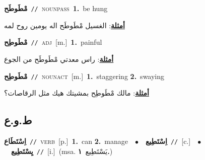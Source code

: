 \documentclass[10pt,a4paper,twoside]{article} %
\begin{document}
\begin{multicols}{2}
{\setlength\topsep{0pt}\textbf{\foreignlanguage{arabic}{مْطَوطَح}}\ {\color{gray}\texttt{//}\color{black}}\ \textsc{noun\textunderscore pass}\ \textbf{1.}~be hung\  \begin{flushright}\color{gray}\foreignlanguage{arabic}{\textbf{\underline{\foreignlanguage{arabic}{أمثلة}}}: الغسيل مْطَوطَح اله يومين روح لمه}\end{flushright}\color{black}} \vspace{2mm}

{\setlength\topsep{0pt}\textbf{\foreignlanguage{arabic}{مْطَوطِح}}\ {\color{gray}\texttt{//}\color{black}}\ \textsc{adj}\ [m.]\ \textbf{1.}~painful\  \begin{flushright}\color{gray}\foreignlanguage{arabic}{\textbf{\underline{\foreignlanguage{arabic}{أمثلة}}}: راس معدتي مْطَوطَح من الجوع}\end{flushright}\color{black}} \vspace{2mm}

{\setlength\topsep{0pt}\textbf{\foreignlanguage{arabic}{مْطَوطِح}}\ {\color{gray}\texttt{//}\color{black}}\ \textsc{noun\textunderscore act}\ [m.]\ \textbf{1.}~staggering  \textbf{2.}~swaying\  \begin{flushright}\color{gray}\foreignlanguage{arabic}{\textbf{\underline{\foreignlanguage{arabic}{أمثلة}}}: مالك مْطَوطِح بمشيتك هيك مثل الرقاصات؟}\end{flushright}\color{black}} \vspace{2mm}

\vspace{-3mm}
\subsection*{\color{blue}\foreignlanguage{arabic}{ط.و.ع}\color{blue}{}} 

{\setlength\topsep{0pt}\textbf{\foreignlanguage{arabic}{اِسْتَطَاع}}\ {\color{gray}\texttt{//}\color{black}}\ \textsc{verb}\ [p.]\ \textbf{1.}~can  \textbf{2.}~manage\ \ $\bullet$\ \ \setlength\topsep{0pt}\textbf{\foreignlanguage{arabic}{اِسْتَطِيع}}\ {\color{gray}\texttt{//}\color{black}}\ [c.]\ \ $\bullet$\ \ \setlength\topsep{0pt}\textbf{\foreignlanguage{arabic}{يِسْتَطِيع}}\ {\color{gray}\texttt{//}\color{black}}\ [i.]\ \color{gray}(msa. \foreignlanguage{arabic}{يَسْتَطِيع}~\foreignlanguage{arabic}{\textbf{١.}})\color{black}\ } \vspace{2mm}


\end{multicols}
\end{document}
